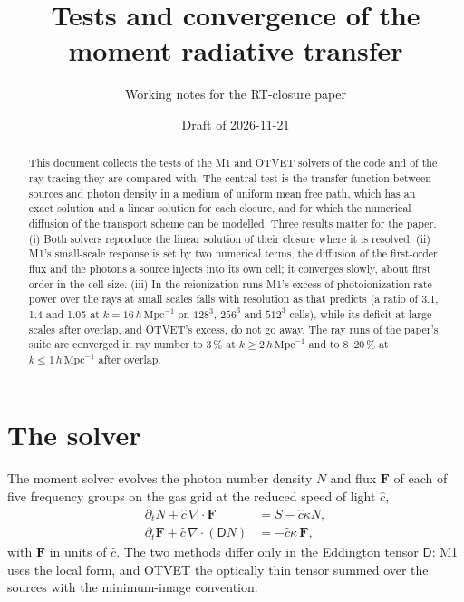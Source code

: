 \documentclass[11pt]{article}
\newcommand{\chat}{\hat{c}}
\newcommand{\hmpc}{\,h\,\mathrm{Mpc}^{-1}}
\begin{document}
\title{Tests and convergence of the moment radiative transfer}
\author{Working notes for the RT-closure paper}
\date{Draft of 2026-11-21}
\maketitle

\begin{abstract}
\noindent This document collects the tests of the M1 and OTVET solvers of the code and of the ray tracing they are
compared with. The central test is the transfer function between sources and photon density in a medium
of uniform mean free path, which has an exact solution and a linear solution for each closure, and for
which the numerical diffusion of the transport scheme can be modelled. Three results matter for the
paper. (i) Both solvers reproduce the linear solution of their closure where it is resolved. (ii) M1's
small-scale response is set by two numerical terms, the diffusion of the first-order flux and the
photons a source injects into its own cell; it converges slowly, about first order in the cell size. (iii) In
the reionization runs M1's excess of photoionization-rate power over the rays at small scales falls
with resolution as that predicts (a ratio of 3.1, 1.4 and 1.05 at $k=16\hmpc$ on $128^3$, $256^3$ and $512^3$ cells), while
its deficit at large scales after overlap, and OTVET's excess, do not go away.
The ray runs of the paper's suite are converged in ray number to 3\,\% at $k\ge2\hmpc$ and to 8--20\,\%
at $k\le1\hmpc$ after overlap.
\end{abstract}

\tableofcontents

\section{The solver}\label{sec:solver}

The moment solver evolves the photon number density $N$ and flux $\mathbf F$ of each of five frequency
groups on the gas grid at the reduced speed of light $\chat$,
\begin{align}
\partial_t N + \chat\,\nabla\!\cdot\mathbf F &= S - \chat\kappa N, \label{eq:N}\\
\partial_t \mathbf F + \chat\,\nabla\!\cdot(\mathsf D N) &= -\chat\kappa\,\mathbf F, \label{eq:F}
\end{align}
with $\mathbf F$ in units of $\chat$. The two methods differ only in the Eddington tensor $\mathsf D$: M1
uses the local \citet{levermore84} form, and OTVET the optically thin tensor summed over the sources with
the minimum-image convention.
\end{document}
